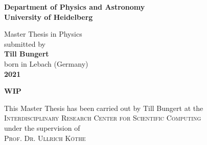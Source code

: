 \begin{titlepage}
\begin{center}
 
\Large\textbf{Department of Physics and Astronomy\\
University of Heidelberg}

\vspace{18cm}

\normalsize
Master Thesis in Physics\\
submitted by\\
\vspace{0.5cm}
\Large\textbf{Till Bungert}\\
\normalsize
\vspace{0.5cm}
born in Lebach (Germany)\\
\vspace{0.5cm}
\Large\textbf{2021}
\normalsize

\newpage

\Large\textbf{WIP}

\vspace{20cm}

\normalsize
\begin{doublespace}
This Master Thesis has been carried out by Till Bungert at the\\
\textsc{Interdisciplinary Research Center for Scientific Computing}\\
under the supervision of\\
\textsc{Prof. Dr. Ullrich Köthe}
\end{doublespace}

\vfill
\end{center}

\end{titlepage}
